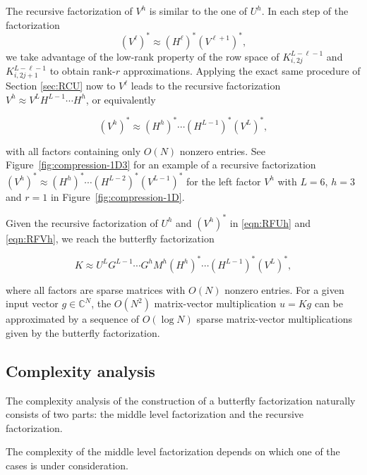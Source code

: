 The recursive factorization of $V^h$ is similar to the one of $U^h$. In each step of the factorization
\[
(V^\ell)^*\approx (H^{\ell})^* (V^{\ell+1})^*,
\]
we take advantage of the low-rank property of the row space of
$K^{L-\ell-1}_{i,2j}$ and $K^{L-\ell-1}_{i,2j+1}$ to obtain rank-$r$ approximations. Applying the exact same procedure of Section
\ref{sec:RCU} now to $V^\ell$ leads to the recursive factorization $V^h \approx V^L H^{L-1} \cdots H^{h}$, or equivalently

\begin{equation}
\label{eqn:RFVh}
(V^h)^* \approx (H^{h})^* \cdots (H^{L-1})^* (V^L)^*,
\end{equation}

with all factors containing only $O(N)$ nonzero entries.  See
Figure~\ref{fig:compression-1D3} for an example of a recursive factorization $(V^h)^* \approx (H^{h})^* \cdots (H^{L-2})^* (V^{L-1})^*$ for the left factor $V^h$ with $L=6$, $h=3$ and $r=1$ in
Figure~\ref{fig:compression-1D}.

Given the recursive factorization of $U^h$ and $(V^h)^*$ in
\eqref{eqn:RFUh} and \eqref{eqn:RFVh}, we reach the butterfly factorization

\begin{equation}
K \approx U^{L}G^{L-1}\cdots G^{h} M^h (H^{h})^* \cdots (H^{L-1})^* (V^L)^*,
\end{equation}

where all factors are sparse matrices with $O(N)$ nonzero entries. For a given input vector $g\in\mathbb{C}^N$, the $O(N^2)$ matrix-vector multiplication $u = Kg$ can be approximated by a sequence of $O(\log
N)$ sparse matrix-vector multiplications given by the butterfly factorization.

\subsection{Complexity analysis}
\label{sec:Complexity}
The complexity analysis of the construction of a butterfly factorization naturally consists of two parts: the middle level factorization and the recursive factorization.

The complexity of the middle level factorization depends on which one of the cases is under consideration.

